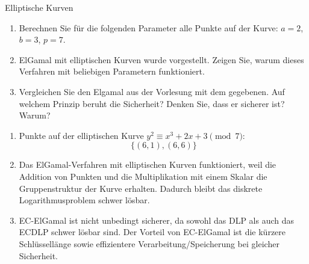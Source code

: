 \documentclass{article}
\begin{document}
\begin{exercise}{Elliptische Kurven}
  \begin{enumerate}
    \item Berechnen Sie für die folgenden Parameter alle Punkte auf der Kurve: $a = 2$, $b = 3$, $p = 7$.
    \item ElGamal mit elliptischen Kurven wurde vorgestellt. Zeigen Sie, warum dieses Verfahren mit beliebigen Parametern funktioniert.
    \item Vergleichen Sie den Elgamal aus der Vorlesung mit dem gegebenen. Auf welchem Prinzip beruht die Sicherheit? Denken Sie, dass er sicherer ist? Warum?
  \end{enumerate}

  \begin{solution}
    \begin{enumerate}
        \item Punkte auf der elliptischen Kurve $y^2\equiv x^3+2x+3 \pmod{7}$:
          \[ \{(6,1), (6,6)\} \]
        \item Das ElGamal-Verfahren mit elliptischen Kurven funktioniert, weil die Addition von Punkten und die Multiplikation mit einem Skalar die Gruppenstruktur der Kurve erhalten. Dadurch bleibt das diskrete Logarithmusproblem schwer lösbar.
        \item EC-ElGamal ist nicht unbedingt sicherer, da sowohl das DLP als auch das ECDLP schwer lösbar sind. Der Vorteil von EC-ElGamal ist die kürzere Schlüssellänge sowie effizientere Verarbeitung/Speicherung bei gleicher Sicherheit.
    \end{enumerate}
  \end{solution}
\end{exercise}
\end{document}
